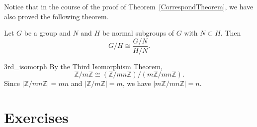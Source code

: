 \medskip
 
 
Notice that in the course of the proof of Theorem~\ref{CorrespondTheorem}, we have also
proved the following theorem. 
 
 
\begin{theorem}\label{ThirdIsoTheorem}
Let $G$ be a group and $N$ and $H$ be normal subgroups of $G$ with $N
\subset H$.  Then 
\[
G/H \cong \frac{G/N}{H/N}.
\]
\end{theorem}
 
 
\begin{example}{3rd_isomorph}
By the Third Isomorphism Theorem,
\[
{\mathbb Z} / m {\mathbb Z} \cong ({\mathbb Z}/ mn {\mathbb Z})/ (m {\mathbb Z}/ mn
{\mathbb Z}). 
\]
Since $| {\mathbb Z} / mn {\mathbb Z} | = mn$ and  $|{\mathbb Z} / m{\mathbb Z}| =
m$, we have $| m {\mathbb Z} / mn {\mathbb Z}| = n$. 
\end{example}
 
 
\section*{Exercises}
\exrule
 
 
 
